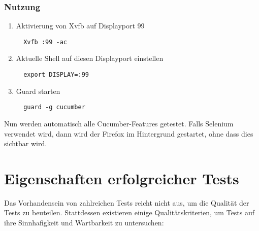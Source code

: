 \subsection*{Nutzung}

\begin{enumerate}
 \item Aktivierung von Xvfb auf Displayport 99
 \begin{verbatim}
  Xvfb :99 -ac
 \end{verbatim}

 \item Aktuelle Shell auf diesen Displayport einstellen
 \begin{verbatim}
  export DISPLAY=:99
 \end{verbatim}

 \item Guard starten
 \begin{verbatim}
  guard -g cucumber
 \end{verbatim}
\end{enumerate}

Nun werden automatisch alle Cucumber-Features getestet. Falls Selenium verwendet wird, dann wird der Firefox im Hintergrund gestartet, ohne dass dies sichtbar wird.

\chapter{Eigenschaften erfolgreicher Tests}

Das Vorhandensein von zahlreichen Tests reicht nicht aus, um die Qualität der Tests zu beuteilen. Stattdessen existieren einige Qualitätskriterien, um Tests auf ihre Sinnhafigkeit und Wartbarkeit zu untersuchen:

